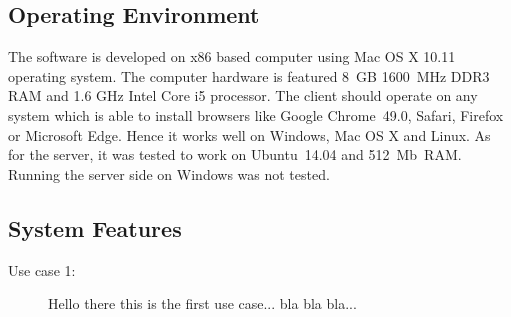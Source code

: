 \subsection{Operating Environment}

The software is developed on x86 based computer using Mac OS X 10.11 operating system. The
computer hardware is featured 8~GB 1600~MHz DDR3 RAM and 1.6 GHz Intel Core i5 processor.
The client should operate on any system which is able to install browsers like Google Chrome~49.0,
Safari, Firefox or Microsoft Edge. Hence it works well on Windows, Mac OS X and Linux. As for the
server, it was tested to work on Ubuntu~14.04 and 512~Mb~RAM. Running the server side on Windows
was not tested.

\subsection{System Features}

\begin{description}
  \item[Use case 1:] Hello there this is the first use case... bla bla bla...
\end{description}
